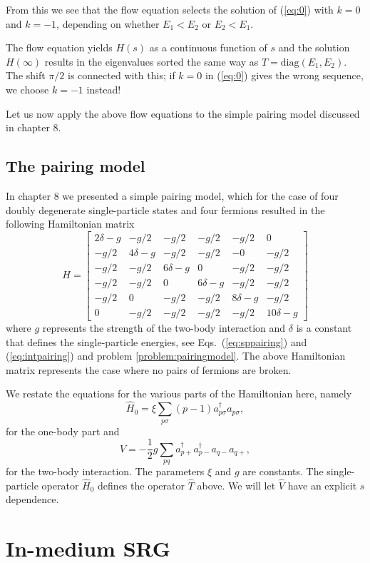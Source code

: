 From this we see that the flow equation selects the solution of (\ref{eq:0}) with
$k=0$ and $k=-1$, depending on whether  $E_1<E_2$ or $E_2<E_1$.

The flow equation yields $H(s)$ as a continuous function of $s$ and the solution
$H(\infty)$ results in the eigenvalues sorted the same way as
$T = \mathrm{diag}(E_1,E_2)$. The shift $\pi/2$ is connected with this; if $k=0$ in 
(\ref{eq:0}) gives the wrong sequence, we choose $k=-1$ instead!

Let us now apply the above flow equations to the simple pairing model discussed in chapter 8. 

\subsection{The pairing model}
In chapter 8 we presented a simple pairing model, which for the case of four doubly degenerate single-particle states and 
four fermions resulted in the following Hamiltonian matrix
 \[
  H = \begin{bmatrix}
  2\delta -g & -g/2 & -g/2 & -g/2 & -g/2 & 0 \\ -g/2 & 4\delta -g &
  -g/2 & -g/2 & -0 & -g/2 \\ -g/2 & -g/2 & 6\delta -g & 0 & -g/2 &
  -g/2 \\ -g/2 & -g/2 & 0 & 6\delta-g & -g/2 & -g/2 \\ -g/2 & 0 & -g/2
  & -g/2 & 8\delta-g & -g/2 \\ 0 & -g/2 & -g/2 & -g/2 & -g/2 &
  10\delta -g
  \end{bmatrix}
  \]
where $g$ represents the strength of the two-body interaction and $\delta$ is a constant that defines the single-particle energies, see Eqs.~(\ref{eq:sppairing}) and 
(\ref{eq:intpairing}) and problem \ref{problem:pairingmodel}.  The above Hamiltonian matrix represents the case where no pairs of fermions are broken.

We restate the equations for the various parts of the Hamiltonian here, namely
 \[
  \hat{H}_0 = \xi \sum_{p \sigma} (p-1) a^{\dagger}_{p \sigma} a_{p\sigma},
  \]
for the one-body part
and 
  \[
  \hat{V} = -\frac{1}{2}g \sum_{pq} a^{\dagger}_{p+}a^{\dagger}_{p-}a_{q-}a_{q+},
  \]
for the two-body interaction. The parameters $\xi$ and $g$ are constants.
The single-particle operator $\hat{H}_0$ defines the operator $\hat{T}$ above. We will let $\hat{V}$ have an explicit $s$ dependence. 

\section{In-medium SRG}

